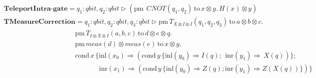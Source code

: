 \begin{align*}
      &\textbf{TeleportIntra-gate} =  q_{1}: \textit{qbit}, q_{2}: \textit{qbit}  \triangleright  (\text{pm}  \hspace{5pt} \textit{CNOT} (q_{1},q_{2})  \hspace{2pt}  \text{to} \hspace{2pt} x \otimes y.  \hspace{2pt}  \textit{H} (x) \otimes y) \\
      &\textbf{TMeasureCorrection}= q_{1}: \textit{qbit}, q_{2}: \textit{qbit},  q_{3}: \textit{qbit} \triangleright \text{pm} \hspace{2pt} T_{X \otimes I \otimes I} (q_{1},q_{2},q_{3}) \hspace{2pt} \text{to} \hspace{2pt} a \otimes b \otimes c . \hspace{2pt}   \\
      &\hspace{125pt} \text{pm} \hspace{2pt} T_{I \otimes X \otimes I} (a,b,c) \hspace{2pt} \text{to} \hspace{2pt} d \otimes e \otimes q. \\
      & \hspace{125pt} \text{pm} \hspace{2pt} \textit{meas} (d) \otimes \textit{meas} (e)  \hspace{2pt} \text{to} \hspace{2pt} x \otimes y. \hspace{2pt} \\
      &  \hspace{125pt} \text{cond}\hspace{2pt} x \hspace{2pt}  \{\text{inl} (x_{0}) \Rightarrow  (\text{cond}\hspace{2pt} y  \hspace{2pt}  \{\text{inl} (y_{0})  \Rightarrow{}  \textit{I}(q) ;  \hspace{5pt} \text{inr} (y_{1}) \Rightarrow  \hspace{2pt}   \textit{X} (q)) \}; \\
      & \hspace{167pt}\text{inr} (x_{1})  \Rightarrow  (\text{cond}\hspace{2pt} y  \hspace{2pt}  \{\text{inl} (y_{0})  \Rightarrow   \textit{Z}(q); \text{inr} (y_{1}) \Rightarrow{} \textit{Z} (\textit{X}(q)) \})\}
 \end{align*}

